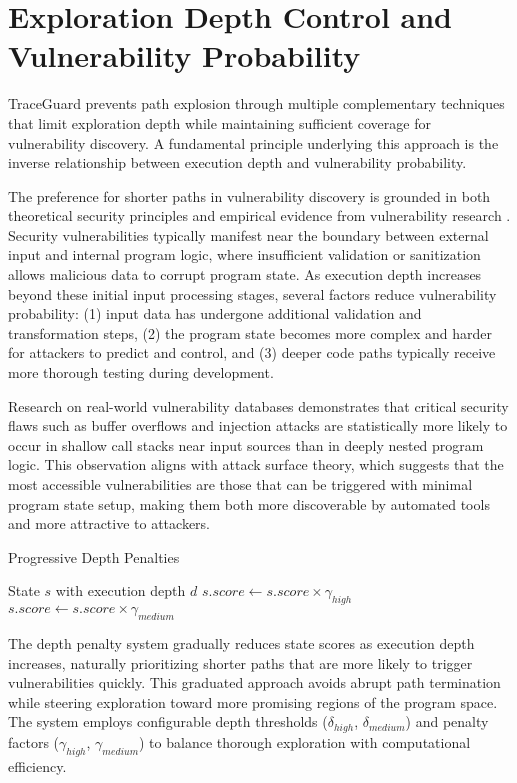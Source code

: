 \section{Exploration Depth Control and Vulnerability Probability}

TraceGuard prevents path explosion through multiple complementary techniques that limit exploration depth while maintaining sufficient coverage for vulnerability discovery. A fundamental principle underlying this approach is the inverse relationship between execution depth and vulnerability probability.

The preference for shorter paths in vulnerability discovery is grounded in both theoretical security principles and empirical evidence from vulnerability research \cite{schwartz_all_2010}. Security vulnerabilities typically manifest near the boundary between external input and internal program logic, where insufficient validation or sanitization allows malicious data to corrupt program state. As execution depth increases beyond these initial input processing stages, several factors reduce vulnerability probability: (1) input data has undergone additional validation and transformation steps, (2) the program state becomes more complex and harder for attackers to predict and control, and (3) deeper code paths typically receive more thorough testing during development.

Research on real-world vulnerability databases demonstrates that critical security flaws such as buffer overflows and injection attacks are statistically more likely to occur in shallow call stacks near input sources than in deeply nested program logic. This observation aligns with attack surface theory, which suggests that the most accessible vulnerabilities are those that can be triggered with minimal program state setup, making them both more discoverable by automated tools and more attractive to attackers.

\begin{algorithm}[H]
\caption{Progressive Depth Penalties}
\begin{algorithmic}[1]
\Require State $s$ with execution depth $d$
    \State $s.score \gets s.score \times \gamma_{high}$
    \State $s.score \gets s.score \times \gamma_{medium}$
\EndIf
\end{algorithmic}
\end{algorithm}

The depth penalty system gradually reduces state scores as execution depth increases, naturally prioritizing shorter paths that are more likely to trigger vulnerabilities quickly. This graduated approach avoids abrupt path termination while steering exploration toward more promising regions of the program space. The system employs configurable depth thresholds ($\delta_{high}$, $\delta_{medium}$) and penalty factors ($\gamma_{high}$, $\gamma_{medium}$) to balance thorough exploration with computational efficiency.

